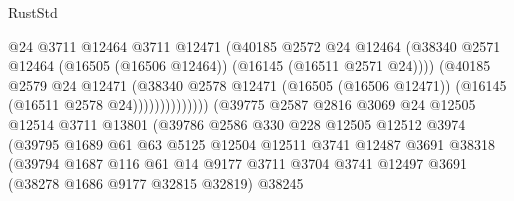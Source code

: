 \begin{lexlean}{RustStd}
\begin{coremodule}
                                          @24
                                          @3711
                                          @12464
                                          @3711
                                          @12471
                                          (@40185
                                            @2572
                                            @24
                                            @12464
                                            (@38340
                                              @2571
                                              @12464
                                              (@16505 (@16506 @12464))
                                              (@16145 (@16511 @2571 @24))))
                                          (@40185
                                            @2579
                                            @24
                                            @12471
                                            (@38340
                                              @2578
                                              @12471
                                              (@16505 (@16506 @12471))
                                              (@16145 (@16511 @2578 @24))))))))))))))
                      (@39775
                        @2587
                        @2816
                        @3069
                        @24
                        @12505
                        @12514
                        @3711
                        @13801
                        (@39786
                          @2586
                          @330
                          @228
                          @12505
                          @12512
                          @3974
                          (@39795
                            @1689
                            @61
                            @63
                            @5125
                            @12504
                            @12511
                            @3741
                            @12487
                            @3691
                            @38318
                            (@39794
                              @1687
                              @116
                              @61
                              @14
                              @9177
                              @3711
                              @3704
                              @3741
                              @12497
                              @3691
                              (@38278 @1686 @9177 @32815 @32819)
                              @38245

\end{coremodule}
\end{lexlean}
